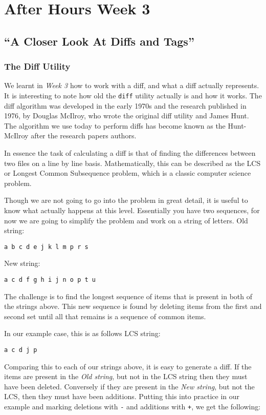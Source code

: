 \chapter{After Hours Week 3}
\section{``A Closer Look At Diffs and Tags''}
\subsection{The Diff Utility}

We learnt in \emph{Week 3} how to work with a diff, and what a diff actually represents.  It is interesting to note how old the \texttt{diff} utility actually is and how it works.  The diff algorithm was developed in the early 1970s and the research published in 1976, by Douglas McIlroy, who wrote the original diff utility and James Hunt.  The algorithm we use today to perform diffs has become known as the Hunt-McIlroy after the research papers authors.

In essence the task of calculating a diff is that of finding the differences between two files on a line by line basis.  Mathematically, this can be described as the LCS or Longest Common Subsequence problem, which is a classic computer science problem.  

Though we are not going to go into the problem in great detail, it is useful to know what actually happens at this level.  Essentially you have two sequences, for now we are going to simplify the problem and work on a string of letters.
Old string: 
\begin{Verbatim}
a b c d e j k l m p r s
\end{Verbatim}

New string: 
\begin{Verbatim}
a c d f g h i j n o p t u
\end{Verbatim}

The challenge is to find the longest sequence of items that is present in both of the strings above.  This new sequence is found by deleting items from the first and second set until all that remains is a sequence of common items.  

In our example case, this is as follows
LCS string: 
\begin{Verbatim}
a c d j p
\end{Verbatim}

Comparing this to each of our strings above, it is easy to generate a diff.  If the items are present in the \emph{Old string}, but not in the LCS string then they must have been deleted.  Conversely if they are present in the \emph{New string}, but not the LCS, then they must have been additions.  Putting this into practice in our example and marking deletions with \texttt{-} and additions with \texttt{+}, we get the following:

